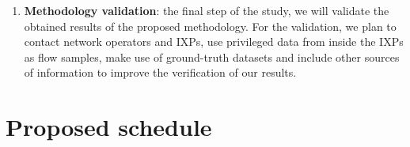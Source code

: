 \begin{enumerate}
\item {\bf Methodology validation}: the final step of the study, we will validate the obtained results of the proposed methodology. For the validation, we plan to contact network operators and IXPs, use privileged data from inside the IXPs as flow samples, make use of ground-truth datasets and include other sources of information to improve the verification of our results. 





\end{enumerate}

\newpage
\section{Proposed schedule}
\label{sec:schedule}

